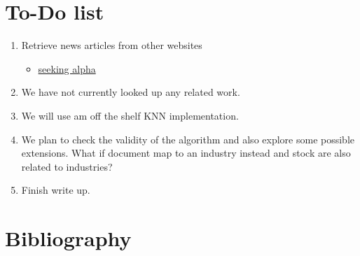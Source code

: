 \documentclass[11pt,letterpaper]{article}
\newcommand{\blue}[1]{\textcolor{RoyalBlue}{#1}}
\newcommand{\instructions}[1]{\blue{\textit{#1}}}
\renewcommand{\instructions}[1]{}
\begin{document}
\section*{To-Do list}
\instructions{Get started by making a to-do list. If you have a group
  project: who will do what? Set yourself deadlines. Here are a few
  items that might appear on your to-do list}
\begin{enumerate}
\item Retrieve news articles from other websites
	\begin{itemize}
		\item \href{ http://seekingalpha.com/ } { seeking alpha }
	\end{itemize}
\item We have not currently looked up any related work.
\item We will use am off the shelf KNN implementation.
\item We plan to check the validity of the algorithm and also explore some possible
  extensions. What if document map to an industry instead and stock are also related
  to industries?
\item Finish write up.
\end{enumerate}

\section*{Bibliography}
{}

\end{document}
